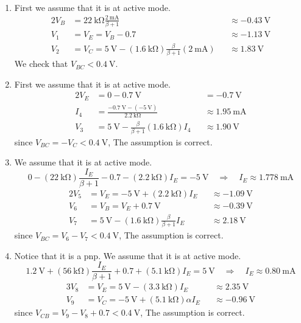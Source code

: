 \documentclass[12pt, a4paper]{article}
\begin{document}
\Ans \\

\begin{enumerate}
  \item 
    First we assume that it is at active mode.
    \begin{alignat*}{2}
      V_B &  = \SI{22}\kohm \frac{\SI{2}\mA}{\beta + 1} && \approx \SI{-0.43}{\V} \\
      V_1 &  = V_E = V_B - 0.7 &&\approx \SI{-1.13}\V \\
      V_2 &  = V_C = \SI{5}\V - (\SI{1.6}\kohm) \frac{\beta}{\beta + 1} (\SI{2}\mA) &&\approx \SI{1.83}\V
    \end{alignat*}
    We check that $V_{BC} < \SI{0.4}\V$.
  \item
    First we assume that it is at active mode.
    \begin{alignat*}{2}
      V_E & = 0 - \SI{0.7}\V &&= \SI{-0.7}\V \\
      I_4 & = \frac{ \SI{-0.7}{\V} - (\SI{-5}\V) }{ \SI{2.2}\kohm } 
      && \approx \SI{1.95}\mA \\
      V_3 & = \SI{5}\V - \frac{\beta}{\beta + 1} (\SI{1.6}\kohm) I_4 
      && \approx \SI{1.90}\V 
    \end{alignat*}
    since $V_{BC} = -V_C < \SI{0.4}\V$, The assumption is correct.
  \item
    We assume that it is at active mode.
    \[
      0 - (\SI{22}{\kohm}) \frac{I_E}{\beta + 1} - 0.7 - (\SI{2.2}\kohm) I_E = \SI{-5}{\V} \quad \Rightarrow \quad I_E \approx \SI{1.778}\mA
    \]
    \begin{alignat*}{2}
      V_5 & = V_E = -\SI{5}\V + (\SI{2.2}\kohm) I_E && \approx \SI{-1.09}\V\\
      V_6 & = V_B = V_E + \SI{0.7}\V && \approx \SI{-0.39}\V \\
      V_7 & = \SI{5}\V - (\SI{1.6}\kohm) \frac{\beta}{\beta + 1} I_E && \approx \SI{2.18}\V
    \end{alignat*}
    since $V_{BC} = V_6 - V_7 < \SI{0.4}\V$, The assumption is correct.

  \item Notice that it is a pnp. We assume that it is at active mode.
    \[
      \SI{1.2}\V + (\SI{56}{\kohm}) \frac{I_E}{\beta + 1} + 0.7 + (\SI{5.1}\kohm) I_E = \SI{5}{\V} \quad \Rightarrow \quad I_E \approx \SI{0.80}\mA
    \]
    \begin{alignat*}{3}
      V_8 & = V_E = \SI{5}\V - (\SI{3.3}\kohm)  I_E && \approx \SI{2.35}\V \\
      V_9 & = V_C = -\SI{5}\V + (\SI{5.1}\kohm) \alpha I_E && \approx \SI{-0.96}\V
    \end{alignat*}
    since $V_{CB} = V_9 - V_8 + 0.7 < \SI{0.4}\V$, The assumption is correct.


\end{enumerate}
\end{document}
